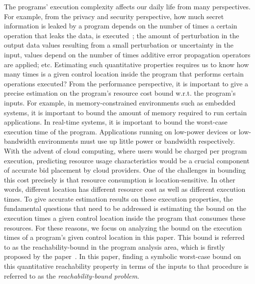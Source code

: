 The programs' execution complexity affects our daily life from many perspectives.
For example,
from the privacy and security perspective,
how much secret information is leaked by a program depends on the number of times a certain operation that leaks the data,
is executed~\cite{Malacaria07};
the amount of perturbation in the output data values resulting
from a small perturbation or uncertainty in the input,
values depend on the number of times additive error propagation operators are applied; etc.
Estimating such quantitative properties requires us to know
how many times is a given control location inside the program that performs certain operations executed?
From the performance perspective, it is important to give a precise estimation
on the program's resource cost bound w.r.t. the program's inputs.
For example, in memory-constrained environments such as embedded systems,
it is important to bound the amount of memory required to run certain applications.
In real-time systems, it is important to bound the worst-case execution time of the program.
Applications running on low-power devices or low-bandwidth environments must use up little power or bandwidth respectively. 
With the advent of cloud computing, where users would be charged per program execution,
predicting resource usage characteristics would be a crucial component of accurate bid placement by cloud providers. 
One of the challenges in bounding this cost precisely is that resource consumption is location-sensitive.
In other words, different location has different resource cost as well as different execution times.
To give accurate estimation results on these execution properties,
the fundamental questions that need to be addressed 
is estimating the bound on the execution times
a given control location inside the program that consumes these resources.
For these reasons, we focus on analyzing the bound on the execution times of a program's given control location in this paper.
This bound is referred to as the reachability-bound in the program analysis area,
which is firstly proposed by the paper~\cite{GulwaniZ10}.
In this paper, finding a symbolic worst-case bound on this quantitative reachability property
in terms of the inputs to that procedure
is referred to as the \emph{reachability-bound problem}.


